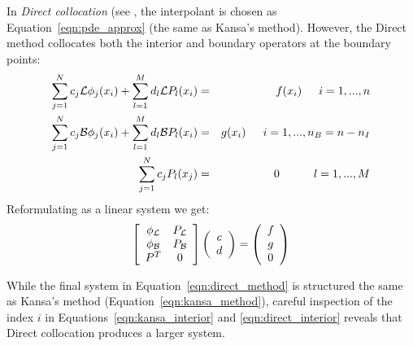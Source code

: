 \documentclass{report}
\begin{document}
{In \emph{Direct collocation} (see \cite{Larsson2003, Fedoseyev2002}, the interpolant is chosen as Equation~\ref{eqn:pde_approx} (the same as Kansa's method). However, the Direct method collocates both the interior and boundary operators at the boundary points:
\begin{eqnarray}
\sum_{j=1}^{N}c_j\mathcal{L}\phi_j(x_i) + \sum_{l=1}^{M}d_l \mathcal{L}P_l(x_i) &=&f(x_i)  \hskip1.5em i = 1,...,n  \label{eqn:direct_interior} \\ 
\sum_{j=1}^{N}c_j\mathcal{B}\phi_j(x_i) + \sum_{l=1}^{M}d_l \mathcal{B}P_l(x_i) &=& g(x_i)  \hskip1.5em i = 1,..., n_B=n-n_I \label{eqn:direct_boundary} \\
 \sum_{j=1}^{N} c_j P_l(x_j) &=& 0 \hskip3.0em l=1,...,M \label{eqn:direct_moments} 
\end{eqnarray}
Reformulating as a linear system we get: 
\begin{eqnarray}
\left[ \begin{array}{c c} 
	\phi_{\mathcal{L}} & P_{\mathcal{L}} \\
	\phi_{\mathcal{B}} & P_{\mathcal{B}} \\
	P^T  & 0 \\
	\end{array} \right] \left( \begin{array}{c}
							{c} \\
							{d}
							 \end{array}
						 \right) = \left( \begin{array}{c}
							{f} \\
							{g} \\
							0
							 \end{array}
						 \right) 
	\label{eqn:direct_method}
\end{eqnarray}

While the final system in Equation~\ref{eqn:direct_method} is structured the same as Kansa's method (Equation~\ref{eqn:kansa_method}), %
careful inspection of the index $i$ in Equations~\ref{eqn:kansa_interior} and \ref{eqn:direct_interior} reveals that Direct collocation produces a larger system. %

}
\end{document}

